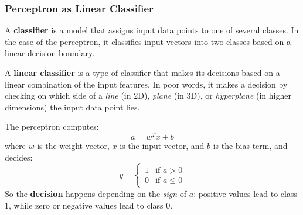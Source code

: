 \subsubsection{Perceptron as Linear Classifier}

A \textbf{classifier} is a model that assigns input data points to one of several classes. In the case of the perceptron, it classifies input vectors into two classes based on a linear decision boundary.

\highspace
A \textbf{linear classifier} is a type of classifier that makes its decisions based on a linear combination of the input features. In poor words, it makes a decision by checking on which side of a \emph{line} (in 2D), \emph{plane} (in 3D), or \emph{hyperplane} (in higher dimensions) the input data point lies.

\highspace
The perceptron computes:
\begin{equation*}
    a = w^{T} x + b
\end{equation*}
where \( w \) is the weight vector, \( x \) is the input vector, and \( b \) is the bias term, and decides:
\begin{equation}\label{eq:perceptron-decision}
    y = \begin{cases}
    1 & \text{if } a > 0 \\
    0 & \text{if } a \le 0
    \end{cases}
\end{equation}
So the \textbf{decision} happens depending on the \emph{sign} of $a$: positive values lead to class 1, while zero or negative values lead to class 0.

